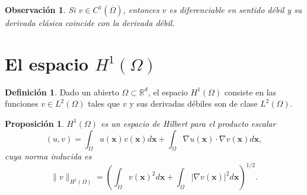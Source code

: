 \documentclass[11pt]{report}
\theoremstyle{plain}
\newtheorem{proposition}[theorem]{Proposición}
\newtheorem{remark}[theorem]{Observación}
\theoremstyle{definition}
\newtheorem{definition}[theorem]{Definición}
\newcommand{\R}{\ensuremath{\mathbb{R}}}
\newcommand{\xx}{\ensuremath{\mathbf{x}}\xspace}
\begin{document}
\begin{remark}
  Si $v\in C^1(\overline\Omega)$, entonces $v$ es diferenciable en sentido débil y su derivada clásica coincide con la derivada débil.
\end{remark}


\section{El espacio $H^1(\Omega)$}
\begin{definition}
  Dado un abierto $\Omega\subset\R^d$, el espacio $H^1(\Omega)$ consiste en las funciones $v\in L^2(\Omega)$ tales que $v$ y sus derivadas débiles son de clase $L^2(\Omega)$.
\end{definition}

\begin{proposition}
  $H^1(\Omega)$ es un espacio de Hilbert para el producto escalar
  \begin{equation}
    \label{eq:producto.escalar.H1}
    (u, v) = \int_\Omega u(\xx) v(\xx) d\xx + \int_\Omega \nabla u(\xx) \cdot \nabla v(\xx) d\xx,
  \end{equation}
  cuya norma inducida es
  \begin{equation}
    \label{eq:norma.H1}
    \|v\|_{H^1(\Omega)} = \left(\int_\Omega v(\xx)^2 d\xx + \int_\Omega |\nabla v(\xx)|^2 d\xx\right)^{1/2}.
  \end{equation}
\end{proposition}
\end{document}
